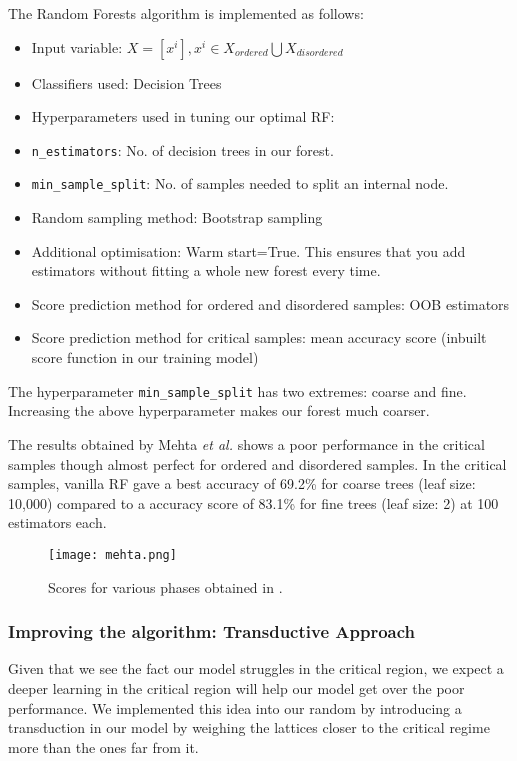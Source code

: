 The Random Forests algorithm is implemented as follows:
\begin{itemize}
    \item Input variable: \(X=[x^i],x^i\in {X_{ordered}\bigcup X_{disordered}}\)
    \item Classifiers used: Decision Trees
    \item Hyperparameters used in tuning our optimal RF:
        \item \texttt{n\_estimators}: No. of decision trees in our forest.
        \item \texttt{min\_sample\_split}: No. of samples needed to split an internal node.
    \item Random sampling method: Bootstrap sampling
    \item Additional optimisation: Warm start=True. This ensures that you add estimators without fitting a whole new forest every time.
    \item Score prediction method for ordered and disordered samples: OOB estimators
    \item Score prediction method for critical samples: mean accuracy score (inbuilt score function in our training model)
\end{itemize}

The hyperparameter \texttt{min\_sample\_split} has two extremes: coarse and fine.
Increasing the above hyperparameter makes our forest much coarser.

The results obtained by Mehta \emph{et al.} \cite{2019} shows a poor performance in the critical samples though almost perfect for ordered and disordered samples. In the critical samples, vanilla RF gave a best accuracy of 69.2\% for coarse trees (leaf size: 10,000) compared to a accuracy score of 83.1\% for fine trees (leaf size: 2) at 100 estimators each.

\begin{figure}[h!]
    \centering
    \texttt{[image: mehta.png]}
    \caption{Scores for various phases obtained in \cite{2019}.}
\end{figure}


\subsubsection{Improving the algorithm: Transductive Approach}
Given that we see the fact our model struggles in the critical region, we expect a deeper learning in the critical region will help our model get over the poor performance.
We implemented this idea into our random by introducing a transduction in our model by weighing the lattices closer to the critical regime more than the ones far from it.

